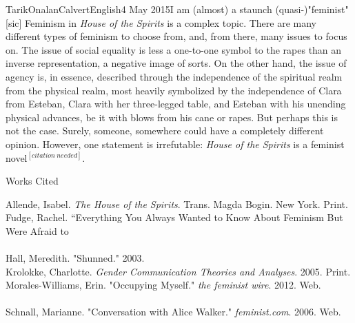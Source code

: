 \documentclass[12pt,a4paper]{article}
\begin{document}
\begin{mla}{Tarik}{Onalan}{Calvert}{English}{4 May 2015}{I am (almost) a staunch (quasi-)"feminist" [sic]}
        Feminism in \textit{House of the Spirits} is a complex topic. There are many different types
        of feminism to choose from, and, from there, many issues to focus on. The issue of social
        equality is less a one-to-one symbol to the rapes than an inverse representation, a negative
		image of sorts. On the other hand, the issue of agency is, in essence, described through the
		independence of the spiritual realm from the physical realm, most heavily symbolized by the
		independence of Clara from Esteban, Clara with her three-legged table, and Esteban with his
		unending physical advances, be it with blows from his cane or rapes. But perhaps this is not
		the case. Surely, someone, somewhere could have a completely different opinion. However, one
		statement is irrefutable: \textit{House of the Spirits} is a feminist novel$^{[citation~needed]}$.
    \end{mla}

    \newpage
    \noindent
    \centerline{Works Cited}
	Allende, Isabel. \textit{The House of the Spirits}. Trans. Magda Bogin. New York. Print.
	\\
	Fudge, Rachel. ``Everything You Always Wanted to Know About Feminism But Were Afraid to
		\\
	\\
	Hall, Meredith. "Shunned." 2003.
	\\
	Krolokke, Charlotte. \textit{Gender Communication Theories and Analyses}. 2005. Print.
	\\
	Morales-Williams, Erin. "Occupying Myself." \textit{the feminist wire}. 2012. Web.
		\\
	\\
	Schnall, Marianne. "Conversation with Alice Walker." \textit{feminist.com}. 2006.
		Web. \\
\end{document}
